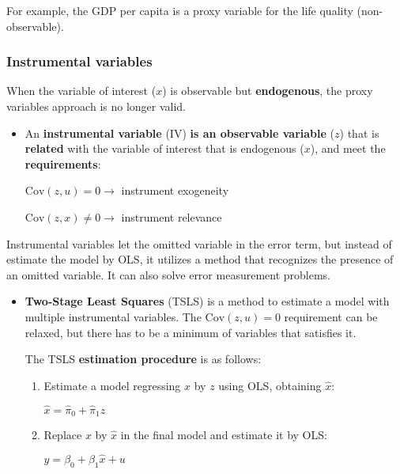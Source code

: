 \documentclass[10pt, a4paper, landscape]{extarticle}
\newcommand{\Cov}{\mathrm{Cov}}
\begin{document}
\begin{multicols}{3}
For example, the GDP per capita is a proxy variable for the life quality (non-observable).

\subsubsection*{Instrumental variables}

When the variable of interest ($x$) is observable but \textbf{endogenous}, the proxy variables approach is no longer valid.

\begin{itemize}[leftmargin=*]
	\item An \textbf{instrumental variable} (IV) \textbf{is an observable variable} ($z$) that is \textbf{related} with the variable of interest that is endogenous ($x$), and meet the \textbf{requirements}:
	\begin{center}
		$\Cov(z, u) = 0 \rightarrow$ instrument exogeneity
		
		$\Cov(z, x) \neq 0 \rightarrow$ instrument relevance
	\end{center}
\end{itemize}

Instrumental variables let the omitted variable in the error term, but instead of estimate the model by OLS, it utilizes a method that recognizes the presence of an omitted variable. It can also solve error measurement problems.

\begin{itemize}[leftmargin=*]
	\item \textbf{Two-Stage Least Squares} (TSLS) is a method to estimate a model with multiple instrumental variables. The $\Cov(z, u) = 0$ requirement can be relaxed, but there has to be a minimum of variables that satisfies it.

	The TSLS \textbf{estimation procedure} is as follows:
	\begin{enumerate}[leftmargin=*]
		\item Estimate a model regressing $x$ by $z$ using OLS, obtaining $\hat{x}$:
		\begin{center}
			$\hat{x} = \hat{\pi}_0 + \hat{\pi}_1 z$
		\end{center}
		\item Replace $x$ by $\hat{x}$ in the final model and estimate it by OLS:
		\begin{center}
			$y = \beta_0 + \beta_1 \hat{x} + u$
		\end{center}
	\end{enumerate}


\end{itemize}
\end{multicols}
\end{document}
